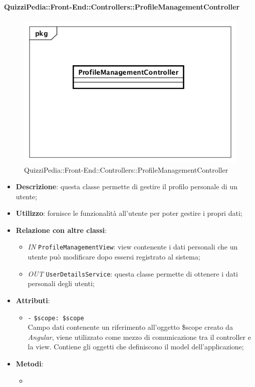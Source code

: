 \paragraph{QuizziPedia::Front-End::Controllers::ProfileManagementController}
\begin{figure} [ht]
	\centering
	\includegraphics[scale=0.45]{UML/Classi/Front-End/QuizziPedia_Front-end_Controller_ProfileManagementController.png}
	\caption{QuizziPedia::Front-End::Controllers::ProfileManagementController}
\end{figure} \FloatBarrier
\begin{itemize}
	\item \textbf{Descrizione}: questa classe permette di gestire il profilo personale di un utente; 
	\item \textbf{Utilizzo}: fornisce le funzionalità all'utente per poter gestire i propri dati;
	\item \textbf{Relazione con altre classi}:
	\begin{itemize}
		\item \textit{IN} \texttt{ProfileManagementView}: view contenente i dati personali che un utente può modificare dopo essersi registrato al sistema;
		\item \textit{OUT} \texttt{UserDetailsService}: questa classe permette di ottenere i dati personali degli utenti;
	\end{itemize}
	\item \textbf{Attributi}:
	\begin{itemize}
		\item \texttt{-} \texttt{\$scope: \$scope} \\
		Campo dati contenente un riferimento all’oggetto \$scope creato da \textit{Angular}, viene utilizzato come mezzo di comunicazione tra il controller e la view. Contiene gli oggetti che definiscono il model dell’applicazione;
	\end{itemize}
	\item \textbf{Metodi}:
	\begin{itemize}
		\item 
	\end{itemize}
\end{itemize}

